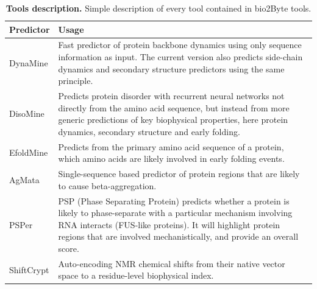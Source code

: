 \begin{table}[ht]
\centering
\small
\caption{\textbf{Tools description.} Simple description of every tool contained in bio2Byte tools.}
\label{tab:tool_explanation}
\begin{tabular}{>{\raggedright\arraybackslash}p{1.5cm} >{\raggedright\arraybackslash}p{10cm}} %
\toprule
\textbf{\color{black} Predictor} & \textbf{\color{black} Usage} \\ \midrule
\color{black} DynaMine & \color{black} Fast predictor of protein backbone dynamics using only sequence information as input. The current version also predicts side-chain dynamics and secondary structure predictors using the same principle. \\ %
\color{black} DisoMine & \color{black} Predicts protein disorder with recurrent neural networks not directly from the amino acid sequence, but instead from more generic predictions of key biophysical properties, here protein dynamics, secondary structure and early folding. \\ %
\color{black} EfoldMine & \color{black} Predicts from the primary amino acid sequence of a protein, which amino acids are likely involved in early folding events. \\ %
\color{black} AgMata & \color{black} Single-sequence based predictor of protein regions that are likely to cause beta-aggregation. \\ %
\color{black} PSPer & \color{black} PSP (Phase Separating Protein) predicts whether a protein is likely to phase-separate with a particular mechanism involving RNA interacts (FUS-like proteins). It will highlight protein regions that are involved mechanistically, and provide an overall score. \\ %
\color{black} ShiftCrypt & \color{black} Auto-encoding NMR chemical shifts from their native vector space to a residue-level biophysical index. \\ \bottomrule
\end{tabular}
\end{table}



